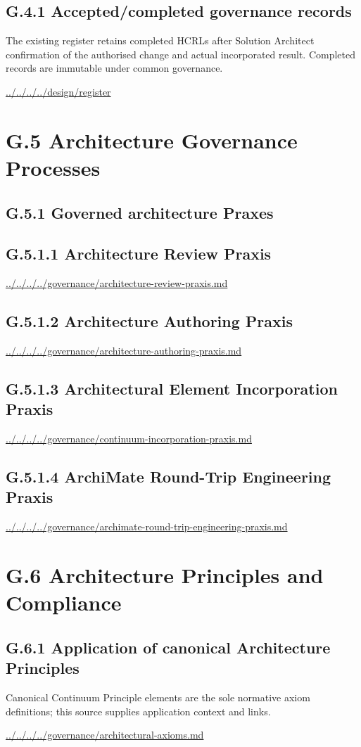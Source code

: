 \documentclass[10pt,a4paper]{article}
\begin{document}
\subsection*{G.4.1 Accepted/completed governance records}
The existing register retains completed HCRLs after Solution Architect confirmation of the authorised change and actual incorporated result. Completed records are immutable under common governance.\par
{\footnotesize\url{../../../../design/register}}\par
\section*{G.5 Architecture Governance Processes}
\subsection*{G.5.1 Governed architecture Praxes}
\subsection*{G.5.1.1 Architecture Review Praxis}
{\footnotesize\url{../../../../governance/architecture-review-praxis.md}}\par
\subsection*{G.5.1.2 Architecture Authoring Praxis}
{\footnotesize\url{../../../../governance/architecture-authoring-praxis.md}}\par
\subsection*{G.5.1.3 Architectural Element Incorporation Praxis}
{\footnotesize\url{../../../../governance/continuum-incorporation-praxis.md}}\par
\subsection*{G.5.1.4 ArchiMate Round-Trip Engineering Praxis}
{\footnotesize\url{../../../../governance/archimate-round-trip-engineering-praxis.md}}\par
\section*{G.6 Architecture Principles and Compliance}
\subsection*{G.6.1 Application of canonical Architecture Principles}
Canonical Continuum Principle elements are the sole normative axiom definitions; this source supplies application context and links.\par
{\footnotesize\url{../../../../governance/architectural-axioms.md}}\par
\end{document}
